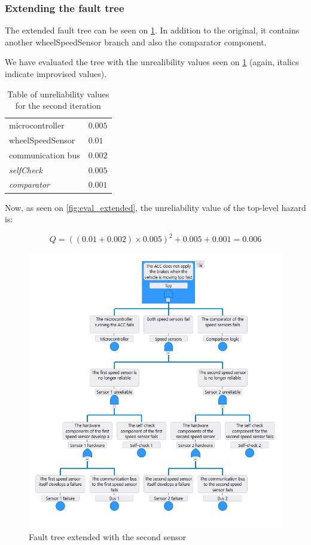 \documentclass[a4paper]{article}
\begin{document}
\subsubsection{Extending the fault tree}

The extended fault tree can be seen on \cref{fig:fault_tree_extended}. In
addition to the original, it contains another \gls{wheelSpeedSensor} branch and
also the comparator component.

We have evaluated the tree with the unrealibility values seen on
\cref{tab:unreliability_extended} (again, italics indicate improvised values).

\begin{table}
	\centering
	\begin{tabular}{ll}
		\toprule
		microcontroller          & \(0.005\) \\
		\gls{wheelSpeedSensor}   & \(0.01\)  \\
		communication bus        & \(0.002\) \\
		\textit{\gls{selfCheck}} & \(0.005\) \\
		\textit{comparator}      & \(0.001\) \\
		\bottomrule
	\end{tabular}
	\caption{Table of unreliability values for the second iteration}%
	\label{tab:unreliability_extended}
\end{table}

Now, as seen on \cref{fig:eval_extended}, the unreliability value of the
top-level hazard is:

\[ Q = {\left((0.01 + 0.002) \times 0.005\right)}^2 + 0.005 + 0.001 = 0.006 \]

\begin{figure}
	\centering
	\includegraphics[width=.5\textwidth]{fault_tree_extended.jpg}
	\caption{Fault tree extended with the second sensor}%
	\label{fig:fault_tree_extended}
\end{figure}
\end{document}
